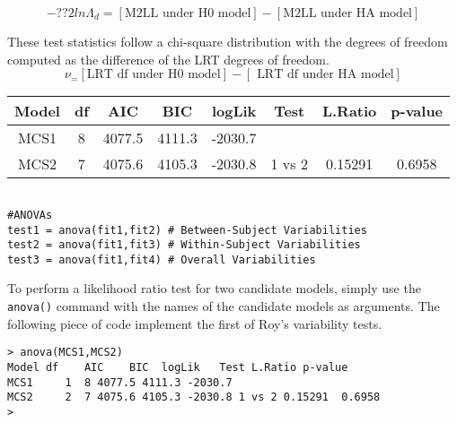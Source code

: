 \begin{equation}
-??2 ln \Lambda_d = [\mbox{M2LL under H0 model}] - [\mbox{M2LL under HA model}] 
\end{equation}

These test statistics follow a chi-square distribution with the degrees of freedom
computed as the difference of the LRT degrees of freedom.
\begin{equation}
\nu_ = [ \mbox{LRT df under H0 model}] - [\mbox{ LRT df under HA model}]
\end{equation}

%
%
%
\begin{center}
\begin{tabular}{|c|c|c|c|c|c|c|c|}
\hline
Model   &      df &   AIC  & BIC      & logLik & Test & L.Ratio & p-value \\ \hline
MCS1    &       8 & 4077.5 & 4111.3 & -2030.7  &       &         &        \\ \hline
MCS2    &       7 & 4075.6 & 4105.3 & -2030.8  & 1 vs 2 & 0.15291 & 0.6958 \\
\hline 
\end{tabular} 
\end{center}
\begin{framed}
\begin{verbatim}

#ANOVAs
test1 = anova(fit1,fit2) # Between-Subject Variabilities
test2 = anova(fit1,fit3) # Within-Subject Variabilities
test3 = anova(fit1,fit4) # Overall Variabilities

\end{verbatim}
\end{framed}

To perform a likelihood ratio test for two candidate models, simply use the \texttt{anova()} command with the names of the candidate models as arguments. The following piece of code implement the first of Roy's variability tests.

\begin{framed}
\begin{verbatim}
> anova(MCS1,MCS2)
Model df    AIC    BIC  logLik   Test L.Ratio p-value
MCS1     1  8 4077.5 4111.3 -2030.7
MCS2     2  7 4075.6 4105.3 -2030.8 1 vs 2 0.15291  0.6958
>
\end{verbatim}
\end{framed}


